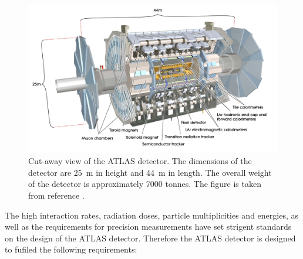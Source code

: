 \begin{figure}[bht]
\begin{centering}	
\includegraphics[width=1.0\textwidth]{Detector_plots/Cut-away-view-of-the-ATLAS-detector.png}
\caption{Cut-away view of the ATLAS detector. 
The dimensions of the detector are 25~m in
height and 44~m in length. The overall weight 
of the detector is approximately 7000 tonnes. The figure is taken from reference \cite{PERF-2007-01}.
	}
\label{fig:ATLAS_cut_away}
\end{centering}
\end{figure}

The high interaction rates, radiation doses, particle multiplicities 
and energies, as well as the requirements for precision measurements 
have set strigent standards on the design of the ATLAS detector. 
Therefore the ATLAS detector is designed to fufiled the following 
requirements:




